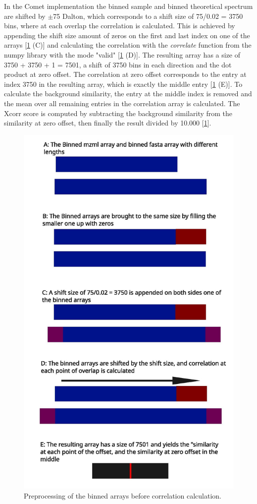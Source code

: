 \documentclass[11pt]{article}
\begin{document}
In the Comet implementation the binned sample and binned theoretical spectrum are shifted by $\pm$75 Dalton, which corresponds to a shift size of 75/0.02 = 3750 bins, where at each overlap the correlation is calculated. This is achieved by appending the shift size amount of zeros on the first and last index on one of the arrays [\cref{fig:corr} (C)] and calculating the correlation with the \textit{correlate} function from the numpy library with the mode "valid" [\cref{fig:corr} (D)]. The resulting array has a size of 3750 + 3750 + 1 = 7501, a shift of 3750 bins in each direction and the dot product at zero offset. The correlation at zero offset corresponds to the entry at index 3750 in the resulting array, which is exactly the middle entry [\cref{fig:corr} (E)]. To calculate the background similarity, the entry at the middle index is removed and the mean over all remaining entries in the correlation array is calculated. The Xcorr score is computed by subtracting the background similarity from the similarity at zero offset, then finally the result divided by 10.000 [\cref{fig:corr}].
\begin{figure}
\includegraphics[width=\linewidth]{figs/crosscorr.jpg} 
\caption{Preprocessing of the binned arrays before correlation calculation.}
\label{fig:corr}
\end{figure}
\end{document}

